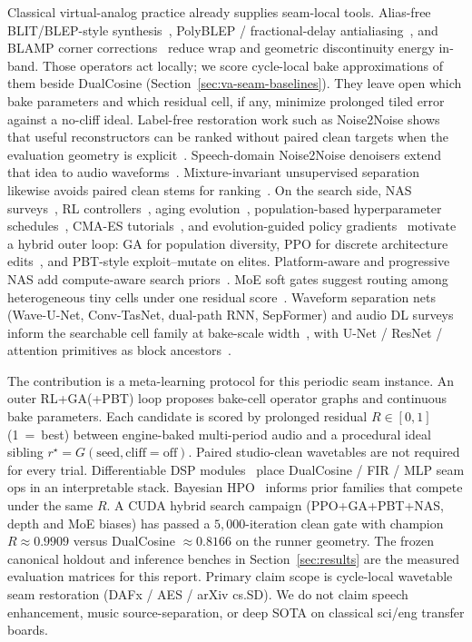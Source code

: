 Classical virtual-analog practice already supplies seam-local tools.
Alias-free BLIT/BLEP-style synthesis~\cite{stilson1996}, PolyBLEP / fractional-delay antialiasing~\cite{nam2009polyblep}, and BLAMP corner corrections~\cite{esqueda2016blamp} reduce wrap and geometric discontinuity energy in-band.
Those operators act locally; we score cycle-local bake approximations of them beside DualCosine (Section~\ref{sec:va-seam-baselines}).
They leave open which bake parameters and which residual cell, if any, minimize prolonged tiled error against a no-cliff ideal.
Label-free restoration work such as Noise2Noise shows that useful reconstructors can be ranked without paired clean targets when the evaluation geometry is explicit~\cite{lehtinen2018}.
Speech-domain Noise2Noise denoisers extend that idea to audio waveforms~\cite{kashyap2021n2n}.
Mixture-invariant unsupervised separation likewise avoids paired clean stems for ranking~\cite{wisdom2020}.
On the search side, NAS surveys~\cite{elsken2019}, RL controllers~\cite{zoph2017nas,pham2018}, aging evolution~\cite{real2017large,real2019}, population-based hyperparameter schedules~\cite{jaderberg2017}, CMA-ES tutorials~\cite{hansen2016cmaes}, and evolution-guided policy gradients~\cite{khadka2018} motivate a hybrid outer loop: GA for population diversity, PPO for discrete architecture edits~\cite{schulman2017}, and PBT-style exploit--mutate on elites.
Platform-aware and progressive NAS add compute-aware search priors~\cite{tan2019mnasnet,liu2018pnas}.
MoE soft gates suggest routing among heterogeneous tiny cells under one residual score~\cite{shazeer2017}.
Waveform separation nets (Wave-U-Net, Conv-TasNet, dual-path RNN, SepFormer) and audio DL surveys inform the searchable cell family at bake-scale width~\cite{stoller2018,macartney2018,luo2019,luo2020dprnn,subakan2021,purwins2019,gong2021ast}, with U-Net / ResNet / attention primitives as block ancestors~\cite{ronneberger2015,he2016resnet,vaswani2017,jansson2017}.

The contribution is a meta-learning protocol for this periodic seam instance.
An outer RL+GA(+PBT) loop proposes bake-cell operator graphs and continuous bake parameters.
Each candidate is scored by prolonged residual $R\in[0,1]$ (1~=~best) between engine-baked multi-period audio and a procedural ideal sibling $r^{\star}=G(\mathrm{seed},\mathrm{cliff{=}off})$.
Paired studio-clean wavetables are not required for every trial.
Differentiable DSP modules~\cite{engel2020} place DualCosine / FIR / MLP seam ops in an interpretable stack.
Bayesian HPO~\cite{snoek2012} informs prior families that compete under the same $R$.
A CUDA hybrid search campaign (PPO+GA+PBT+NAS, depth and MoE biases) has passed a $5{,}000$-iteration clean gate with champion $R\approx 0.9909$ versus DualCosine $\approx 0.8166$ on the runner geometry.
The frozen canonical holdout and inference benches in Section~\ref{sec:results} are the measured evaluation matrices for this report.
Primary claim scope is cycle-local wavetable seam restoration (DAFx / AES / arXiv cs.SD).
We do not claim speech enhancement, music source-separation, or deep SOTA on classical sci/eng transfer boards.

